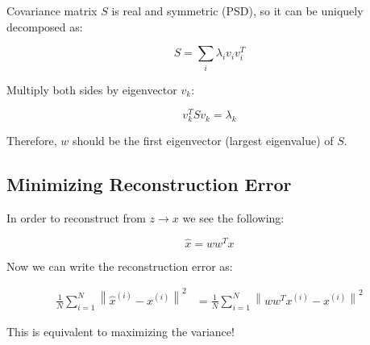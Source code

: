 \documentclass[11pt]{article}
\begin{document}
\medskip
Covariance matrix $S$ is real and symmetric (PSD), so it can be uniquely decomposed as:

\[
	S = \sum_i \lambda_i v_i v_i^T
\]

Multiply both sides by eigenvector $v_k$:

\[
	v_k^T S v_k = \lambda_k
\]

\bigskip

Therefore, $w$ should be the first eigenvector (largest eigenvalue) of $S$.


\subsection*{Minimizing Reconstruction Error}

In order to reconstruct from $z \rightarrow x$ we see the following:

\[
	\hat{x} = w w^T x
\]

Now we can write the reconstruction error as:

\begin{align}
	\frac{1}{N} \sum_{i=1}^{N} \left\| \hat{x}^{(i)} - x^{(i)} \right\|^2
	 & = \frac{1}{N} \sum_{i=1}^{N} \left\| ww^T x^{(i)} - x^{(i)} \right\|^2
\end{align}

This is equivalent to maximizing the variance! 
\end{document}
